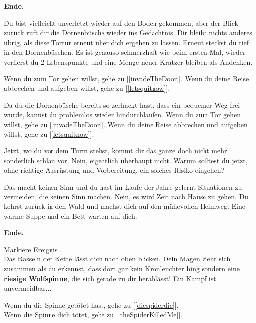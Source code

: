 \textbf{Ende.}


Du bist vielleicht unverletzt wieder auf den Boden gekommen, aber der Blick zurück ruft dir die Dornenbüsche wieder ins Gedächtnis. Dir bleibt nichts anderes übrig, als diese Tortur erneut über dich ergehen zu lassen. Erneut steckst du tief in den Dornenbüschen. Es ist genauso schmerzhaft wie beim ersten Mal, wieder verlierst du 2 Lebenspunkte und eine Menge neuer Kratzer bleiben als Andenken.

Wenn du zum Tor gehen willst, gehe zu [\ref{invadeTheDoor}].
Wenn du deine Reise abbrechen und aufgeben willst, gehe zu [\ref{letsquitnow}].


Da du die Dornenbüsche bereits so zerhackt hast, dass ein bequemer Weg frei wurde, kannst du problemlos wieder hindurchlaufen.
Wenn du zum Tor gehen willst, gehe zu [\ref{invadeTheDoor}].
Wenn du deine Reise abbrechen und aufgeben willst, gehe zu [\ref{letsquitnow}].


Jetzt, wo du vor dem Turm stehst, kommt dir das ganze doch nicht mehr sonderlich schlau vor. Nein, eigentlich überhaupt nicht. Warum solltest du jetzt, ohne richtige Ausrüstung und Vorbereitung, ein solches Risiko eingehen?

Das macht keinen Sinn und du hast im Laufe der Jahre gelernt Situationen zu vermeiden, die keinen Sinn machen. Nein, es wird Zeit nach Hause zu gehen. Du kehrst zurück in den Wald und machst dich auf den mühevollen Heimweg. Eine warme Suppe und ein Bett warten auf dich.

\textbf{Ende.}


Markiere Ereignis . \\Das Rasseln der Kette lässt dich nach oben blicken. Dein Magen zieht sich zusammen als du erkennst, dass dort gar kein Kronleuchter hing sondern eine \textbf{riesige Wolfspinne}, die sich gerade zu dir herablässt! Ein Kampf ist unvermeidbar...


Wenn du die Spinne getötet hast, gehe zu [\ref{diespiderdie}].
\\Wenn die Spinne dich tötet, gehe zu [\ref{theSpiderKilledMe}].

